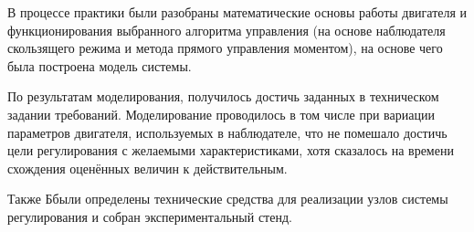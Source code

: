 \Conclusion %
\thispagestyle{empty}

В процессе практики были разобраны математические основы работы двигателя и функционирования выбранного алгоритма управления (на основе наблюдателя скользящего режима и метода прямого управления моментом), на основе чего была построена модель системы.

По результатам моделирования, получилось достичь заданных в техническом задании требований. Моделирование проводилось в том числе при вариации параметров двигателя, используемых в наблюдателе, что не помешало достичь цели регулирования с желаемыми характеристиками, хотя сказалось на времени схождения оценённых величин к действительным.

Также Ббыли определены технические средства для реализации узлов системы регулирования и собран экспериментальный стенд.

